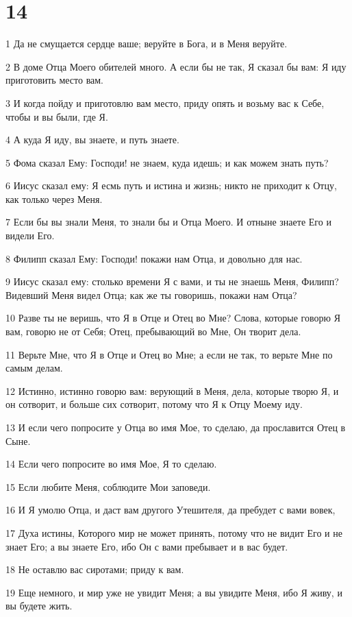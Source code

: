 \chapter{14}

\par 1 Да не смущается сердце ваше; веруйте в Бога, и в Меня веруйте.
\par 2 В доме Отца Моего обителей много. А если бы не так, Я сказал бы вам: Я иду приготовить место вам.
\par 3 И когда пойду и приготовлю вам место, приду опять и возьму вас к Себе, чтобы и вы были, где Я.
\par 4 А куда Я иду, вы знаете, и путь знаете.
\par 5 Фома сказал Ему: Господи! не знаем, куда идешь; и как можем знать путь?
\par 6 Иисус сказал ему: Я есмь путь и истина и жизнь; никто не приходит к Отцу, как только через Меня.
\par 7 Если бы вы знали Меня, то знали бы и Отца Моего. И отныне знаете Его и видели Его.
\par 8 Филипп сказал Ему: Господи! покажи нам Отца, и довольно для нас.
\par 9 Иисус сказал ему: столько времени Я с вами, и ты не знаешь Меня, Филипп? Видевший Меня видел Отца; как же ты говоришь, покажи нам Отца?
\par 10 Разве ты не веришь, что Я в Отце и Отец во Мне? Слова, которые говорю Я вам, говорю не от Себя; Отец, пребывающий во Мне, Он творит дела.
\par 11 Верьте Мне, что Я в Отце и Отец во Мне; а если не так, то верьте Мне по самым делам.
\par 12 Истинно, истинно говорю вам: верующий в Меня, дела, которые творю Я, и он сотворит, и больше сих сотворит, потому что Я к Отцу Моему иду.
\par 13 И если чего попросите у Отца во имя Мое, то сделаю, да прославится Отец в Сыне.
\par 14 Если чего попросите во имя Мое, Я то сделаю.
\par 15 Если любите Меня, соблюдите Мои заповеди.
\par 16 И Я умолю Отца, и даст вам другого Утешителя, да пребудет с вами вовек,
\par 17 Духа истины, Которого мир не может принять, потому что не видит Его и не знает Его; а вы знаете Его, ибо Он с вами пребывает и в вас будет.
\par 18 Не оставлю вас сиротами; приду к вам.
\par 19 Еще немного, и мир уже не увидит Меня; а вы увидите Меня, ибо Я живу, и вы будете жить.
